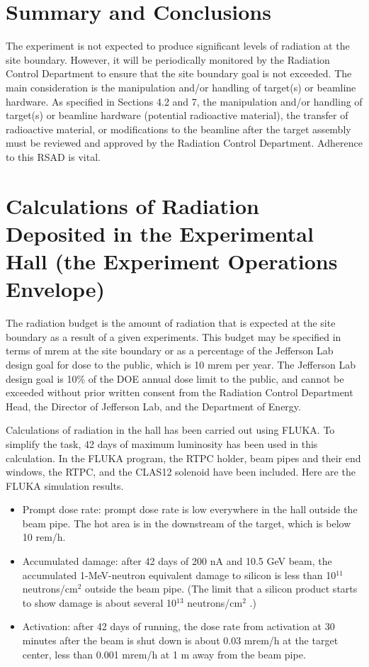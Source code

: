 \documentclass[12pt]{article}
\begin{document}
\section{Summary and Conclusions}
The experiment is not expected to produce significant levels of radiation at 
the site boundary. However, it will be periodically monitored by
the Radiation Control Department to ensure that the site boundary goal is
not exceeded. The main consideration is the manipulation and/or handling
of target(s) or beamline hardware. As specified in Sections 4.2 and 7, the
manipulation and/or handling of target(s) or beamline hardware (potential
radioactive material), the transfer of radioactive material, or modifications
to the beamline after the target assembly must be reviewed and approved by
the Radiation Control Department. Adherence to this RSAD is vital.

\section{Calculations of Radiation Deposited in the
Experimental Hall (the Experiment Operations Envelope)}

The radiation budget is the amount of radiation that is expected at the
site boundary as a result of a given experiments. This budget may be specified 
in terms of mrem at the site boundary or as a percentage of the Jefferson Lab 
design goal for dose to the public, which is 10 mrem per year. The Jefferson 
Lab design goal is 10\% of the DOE annual dose limit to the public, and
cannot be exceeded without prior written consent from the Radiation Control 
Department Head, the Director of Jefferson Lab, and the Department of Energy.

Calculations of radiation in the hall has been carried out using FLUKA.
To simplify the task, 42 days of maximum luminosity has been used in this
calculation. In the FLUKA program, the RTPC holder, beam pipes and their
end windows, the RTPC, and the CLAS12 solenoid have been included. Here
are the FLUKA simulation results.
\begin{itemize}
   \item Prompt dose rate: prompt dose rate is low everywhere in the hall
outside the beam pipe. The hot area is in the downstream of the
target, which is below 10 rem/h.
\item Accumulated damage: after 42 days of 200 nA and 10.5 GeV beam, the
accumulated 1-MeV-neutron equivalent damage to silicon is less than
      10$^{11}$ neutrons/cm$^2$ outside the beam pipe. (The limit that a 
      silicon
      product starts to show damage is about several 10$^{13}$ 
      neutrons/cm$^{2}$ .)
\item Activation: after 42 days of running, the dose rate from activation at
30 minutes after the beam is shut down is about 0.03 mrem/h at the
target center, less than 0.001 mrem/h at 1 m away from the beam pipe.
\end{itemize}
\end{document}
